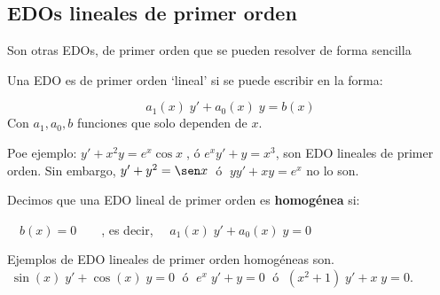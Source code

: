 \subsection{EDOs lineales de primer orden}

Son otras EDOs, de primer orden que se pueden resolver de forma sencilla

\begin{cuadro-naranja}
	
\begin{defi}
Una EDO es de primer orden `lineal' si se puede escribir en la forma:

\begin{equation*}
	\boxed{\; a_1(x)\; y' +a_0(x)\; y = b(x)\;} 
\end{equation*}	
Con $a_1, a_0, b$ funciones que solo dependen de $x$.
\end{defi}
\end{cuadro-naranja}

Poe ejemplo: $y'+x^2y=e^x \cos x\; $, ó \; $e^x y' +y =x^3$, son EDO lineales de primer orden. Sin embargo, $y'+y^2=\sen x\; $ ó $\; yy'+xy=e^x$ no lo son.

\begin{cuadro-naranja}
\begin{defi}
Decimos que una EDO lineal de primer orden es \textbf{homogénea} si:

 $\quad b(x)=0\qquad$, es decir, $\quad  a_1(x)\; y' +a_0(x)\; y = 0$	
\end{defi}
\end{cuadro-naranja}

Ejemplos de EDO lineales de primer orden homogéneas son. $\; \sin (x)\; y' + \cos(x)\; y = 0\; $ ó $\; e^x\; y'+y=0\; $ ó $\; (x^2+1) \; y'+x\; y=0$.

